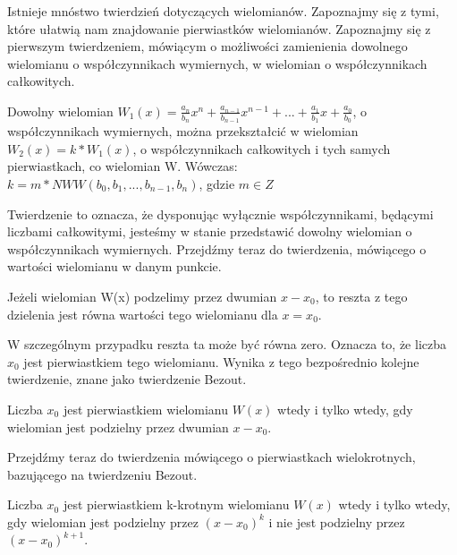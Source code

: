 Istnieje mnóstwo twierdzień dotyczących wielomianów. Zapoznajmy się z tymi, które ułatwią nam znajdowanie pierwiastków wielomianów. Zapoznajmy się z pierwszym twierdzeniem, mówiącym o możliwości zamienienia dowolnego wielomianu o współczynnikach wymiernych, w wielomian o współczynnikach całkowitych.

\begin{theorem}
	$ $\\
	Dowolny wielomian $W_1(x) = \frac{a_n}{b_n}x^n + \frac{a_{n-1}}{b_{n-1}}x^{n-1} + ... + \frac{a_1}{b_1}x + \frac{a_0}{b_0}$, o współczynnikach wymiernych, można przekształcić w wielomian $W_2(x) = k * W_1(x)$, o współczynnikach całkowitych i tych samych pierwiastkach, co wielomian W. Wówczas: \\
	$k = m * NWW(b_0, b_1, ..., b_{n-1}, b_n)$, gdzie $m\in Z$
\end{theorem}

Twierdzenie to oznacza, że dysponując wyłącznie współczynnikami, będącymi liczbami całkowitymi, jesteśmy w stanie przedstawić dowolny wielomian o współczynnikach wymiernych. Przejdźmy teraz do twierdzenia, mówiącego o wartości wielomianu w danym punkcie.

\begin{theorem}
	$ $\\
	Jeżeli wielomian W(x) podzelimy przez dwumian $x - x_0$, to reszta z tego dzielenia jest równa wartości tego wielomianu dla $x = x_0$.
\end{theorem}

W szczególnym przypadku reszta ta może być równa zero. Oznacza to, że liczba $x_0$ jest pierwiastkiem tego wielomianu. Wynika z tego bezpośrednio kolejne twierdzenie, znane jako twierdzenie Bezout.

\begin{theorem}[Bezout]
	$ $\\
	Liczba $x_0$ jest pierwiastkiem wielomianu $W(x)$ wtedy i tylko wtedy, gdy wielomian jest podzielny przez dwumian $x - x_0$.
\end{theorem}

Przejdźmy teraz do twierdzenia mówiącego o pierwiastkach wielokrotnych, bazującego na twierdzeniu Bezout.

\begin{theorem}
	$ $\\
	Liczba $x_0$ jest pierwiastkiem k-krotnym wielomianu $W(x)$ wtedy i tylko wtedy, gdy wielomian jest podzielny przez $(x - x_0)^k$ i nie jest podzielny przez $(x - x_0)^{k+1}$.
\end{theorem}

